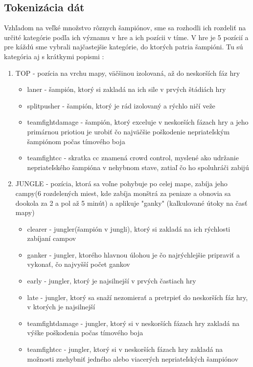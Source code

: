 \subsection{Tokenizácia dát}
Vzhľadom na veľké množstvo rôznych šampiónov, sme sa rozhodli ich rozdeliť na určité kategórie podľa ich významu v hre a ich pozícii v tíme.
V hre je 5 pozícií a pre káždú sme vybrali najčastejšie kategórie, do ktorých patria šampióni. Tu sú kategória aj s krátkymi popismi :
\begin{enumerate}
	\item TOP - pozícia na vrchu mapy, väčšinou izolovaná, až do neskorších fáz hry
	 \begin{itemize}
		\item laner - šampión, ktorý si zakladá na ich sile v prvých štádiách hry
		\item splitpusher - šampión, ktorý je rád izolovaný a rýchlo ničí veže
		\item teamfightdamage - šampión, ktorý exceluje v neskorších fázach hry a jeho primárnou priotiou je urobiť čo najväčšie poškodenie nepriateľským šampiónom počas tímového boja
		\item teamfightcc - skratka cc znamená crowd control, myslené ako udržanie nepriateľského šampióna v nehybnom stave, zatiaľ čo ho spoluhráči zabijú
	\end{itemize}
	\item JUNGLE - pozícia, ktorá sa voľne pohybuje po celej mape, zabíja jeho campy(6 rozdelených miest, kde zabíja monštrá za peniaze a obnovia sa dookola za 2 a pol až 5 minút)  a aplikuje "ganky" (kalkulované útoky na časť mapy)
	\begin{itemize}
		\item clearer - jungler(šampión v jungli), ktorý si zakladá na ich rýchlosti zabíjaní campov
		\item ganker - jungler, ktorého hlavnou úlohou je čo najrýchlejšie pripraviť a vykonať, čo najvyšší počet gankov
		\item early - jungler, ktorý je najsilnejší v prvých častiach hry
		\item late - jungler, ktorý sa snaží nezomierať a pretrpieť do neskorších fáz hry, v ktorých je najsilnejší
		\item teamfightdamage - jungler, ktorý si v neskorších fázach hry zakladá na výške poškodenia počas tímového boja
		\item teamfightcc - jungler, ktorý si v neskorších fázach hry zakladá na možnosti znehybniť jedného alebo viacerých nepriateľských šampiónov

\end{itemize}
\end{enumerate}
